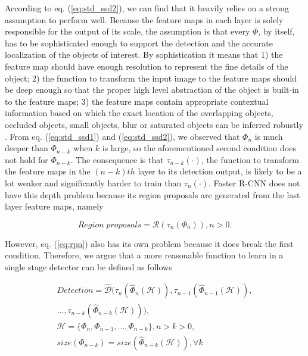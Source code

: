 \documentclass[10pt,twocolumn,letterpaper]{article}
\begin{document}
According to eq. (\ref{eq:std_ssd2}), we can find that it heavily relies on a strong assumption to perform well. Because the feature maps in each layer is solely responsible for the output of its scale, the assumption is that every $\Phi$, by itself, has to be sophisticated enough to support the detection and the accurate localization of the objects of interest. By sophistication it means that 1) the feature map should have enough resolution to represent the fine details of the object; 2) the function to transform the input image to the feature maps should be deep enough so that the proper high level abstraction of the object is built-in to the feature maps; 3) the feature maps contain appropriate contextual information based on which the exact location of the overlapping objects, occluded objects, small objects, blur or saturated objects can be inferred robustly \cite{RenSQ16,liu15ssd,Stewart16}. From eq. (\ref{eq:std_ssd1}) and (\ref{eq:std_ssd2}), we observed that $\Phi_{n}$ is much deeper than $\Phi_{n-k}$ when $k$ is large, so the aforementioned second condition does not hold for $\Phi_{n-k}$. The consequence is that $\tau_{n-k}(\cdot)$, the function to transform the feature maps in the $(n-k)th$ layer to its detection output, is likely to be a lot weaker and significantly harder to train than $\tau_{n}(\cdot)$. Faster R-CNN does not have this depth problem because its region proposals are generated from the last layer feature maps, namely

\vspace{-0.5\baselineskip}
\begin{equation}
Region \; proposals = \mathcal{R}(\tau_{n}(\Phi_{n})), n > 0.
\label{eq:rpn}
\end{equation}

\noindent However, eq. (\ref{eq:rpn}) also has its own problem because it does break the first condition. Therefore, we argue that a more reasonable function to learn in a single stage detector can be defined as follows

\vspace{-0.5\baselineskip}
\begin{equation}
\begin{split}
Detection = \mathcal{\hat{D}}(\tau_{n}(\hat{\Phi}_{n}(\mathcal{H})),\tau_{n-1}(\hat{\Phi}_{n-1}(\mathcal{H})),\\
...,\tau_{n-k}(\hat{\Phi}_{n-k}(\mathcal{H}))), \\ 
\mathcal{H} = \{\Phi_{n}, \Phi_{n-1}, ..., \Phi_{n-k}\}, n \! > \! k \! > \! 0, \\
size(\Phi_{n-k}) = size(\hat{\Phi}_{n-k}(\mathcal{H})), \forall k
\end{split}
\label{eq:good_ssd}
\end{equation}
\end{document}
